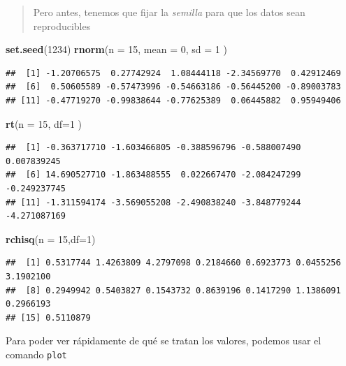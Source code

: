 \documentclass[]{book}
\newenvironment{Shaded}{\begin{snugshade}}{\end{snugshade}}
\newcommand{\DataTypeTok}[1]{\textcolor[rgb]{0.13,0.29,0.53}{#1}}
\newcommand{\DecValTok}[1]{\textcolor[rgb]{0.00,0.00,0.81}{#1}}
\newcommand{\KeywordTok}[1]{\textcolor[rgb]{0.13,0.29,0.53}{\textbf{#1}}}
\newcommand{\NormalTok}[1]{#1}
\begin{document}
\begin{quote}
Pero antes, tenemos que fijar la \emph{semilla} para que los datos sean reproducibles
\end{quote}

\begin{Shaded}
\begin{Highlighting}[]
\KeywordTok{set.seed}\NormalTok{(}\DecValTok{1234}\NormalTok{)}
\KeywordTok{rnorm}\NormalTok{(}\DataTypeTok{n =} \DecValTok{15}\NormalTok{, }\DataTypeTok{mean =} \DecValTok{0}\NormalTok{, }\DataTypeTok{sd =} \DecValTok{1}\NormalTok{ )}
\end{Highlighting}
\end{Shaded}

\begin{verbatim}
##  [1] -1.20706575  0.27742924  1.08444118 -2.34569770  0.42912469
##  [6]  0.50605589 -0.57473996 -0.54663186 -0.56445200 -0.89003783
## [11] -0.47719270 -0.99838644 -0.77625389  0.06445882  0.95949406
\end{verbatim}

\begin{Shaded}
\begin{Highlighting}[]
\KeywordTok{rt}\NormalTok{(}\DataTypeTok{n =} \DecValTok{15}\NormalTok{, }\DataTypeTok{df=}\DecValTok{1}\NormalTok{ )}
\end{Highlighting}
\end{Shaded}

\begin{verbatim}
##  [1] -0.363717710 -1.603466805 -0.388596796 -0.588007490  0.007839245
##  [6] 14.690527710 -1.863488555  0.022667470 -2.084247299 -0.249237745
## [11] -1.311594174 -3.569055208 -2.490838240 -3.848779244 -4.271087169
\end{verbatim}

\begin{Shaded}
\begin{Highlighting}[]
\KeywordTok{rchisq}\NormalTok{(}\DataTypeTok{n =} \DecValTok{15}\NormalTok{,}\DataTypeTok{df=}\DecValTok{1}\NormalTok{)}
\end{Highlighting}
\end{Shaded}

\begin{verbatim}
##  [1] 0.5317744 1.4263809 4.2797098 0.2184660 0.6923773 0.0455256 3.1902100
##  [8] 0.2949942 0.5403827 0.1543732 0.8639196 0.1417290 1.1386091 0.2966193
## [15] 0.5110879
\end{verbatim}

Para poder ver rápidamente de qué se tratan los valores, podemos usar el comando \texttt{plot}
\end{document}
